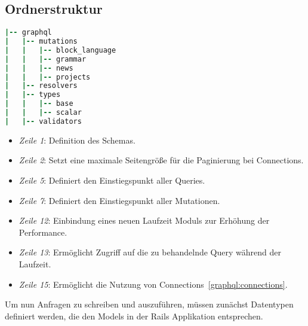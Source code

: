 \subsection{Ordnerstruktur}
\begin{lstlisting}[language=Ruby,float=h!,caption={Ordnerstruktur}, label={lst:graphql:directory}]
|-- graphql
|   |-- mutations
|   |   |-- block_language
|   |   |-- grammar
|   |   |-- news
|   |   |-- projects
|   |-- resolvers
|   |-- types
|   |   |-- base
|   |   |-- scalar
|   |-- validators
\end{lstlisting}


\begin{itemize}
	\setlength\itemsep{-1em}
	\item \emph{Zeile 1}: Definition des Schemas.
	\item \emph{Zeile 2}: Setzt eine maximale Seitengröße für die Paginierung bei Connections.
	\item \emph{Zeile 5}: Definiert den Einstiegspunkt aller Queries.
	\item \emph{Zeile 7}: Definiert den Einstiegspunkt aller Mutationen.
	\item \emph{Zeile 12}: Einbindung eines neuen Laufzeit Moduls zur Erhöhung der Performance.
	\item \emph{Zeile 13}: Ermöglicht Zugriff auf die zu behandelnde Query während der Laufzeit.
	\item \emph{Zeile 15}: Ermöglicht die Nutzung von Connections~\ref{graphql:connections}.
\end{itemize}

Um nun Anfragen zu schreiben und auszuführen, müssen zunächst Datentypen definiert werden, die den Models in der Rails Applikation entsprechen.



